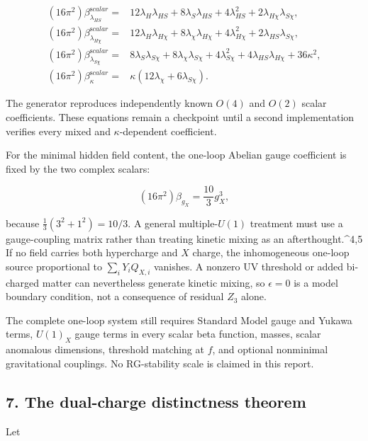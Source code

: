 \documentclass[
]{article}
\begin{document}
\[
\begin{aligned}
(16\pi^2)\beta_{\lambda_{HS}}^{\mathrm scalar}={}&
12\lambda_H\lambda_{HS}+8\lambda_S\lambda_{HS}
+4\lambda_{HS}^2+2\lambda_{H\chi}\lambda_{S\chi},\\
(16\pi^2)\beta_{\lambda_{H\chi}}^{\mathrm scalar}={}&
12\lambda_H\lambda_{H\chi}+8\lambda_\chi\lambda_{H\chi}
+4\lambda_{H\chi}^2+2\lambda_{HS}\lambda_{S\chi},\\
(16\pi^2)\beta_{\lambda_{S\chi}}^{\mathrm scalar}={}&
8\lambda_S\lambda_{S\chi}+8\lambda_\chi\lambda_{S\chi}
+4\lambda_{S\chi}^2+4\lambda_{HS}\lambda_{H\chi}
+36\kappa^2,\\
(16\pi^2)\beta_\kappa^{\mathrm scalar}={}&
\kappa(12\lambda_\chi+6\lambda_{S\chi}).
\end{aligned}
\]

The generator reproduces independently known \(O(4)\) and \(O(2)\)
scalar coefficients. These equations remain a checkpoint until a second
implementation verifies every mixed and \(\kappa\)-dependent
coefficient.

For the minimal hidden field content, the one-loop Abelian gauge
coefficient is fixed by the two complex scalars:

\[
(16\pi^2)\beta_{g_X}=\frac{10}{3}g_X^3,
\]

because \(\frac13(3^2+1^2)=10/3\). A general multiple-\(U(1)\) treatment
must use a gauge-coupling matrix rather than treating kinetic mixing as
an afterthought.\^{}4,5 If no field carries both hypercharge and \(X\)
charge, the inhomogeneous one-loop source proportional to
\(\sum_iY_iQ_{X,i}\) vanishes. A nonzero UV threshold or added
bi-charged matter can nevertheless generate kinetic mixing, so
\(\epsilon=0\) is a model boundary condition, not a consequence of
residual \(Z_3\) alone.

The complete one-loop system still requires Standard Model gauge and
Yukawa terms, \(U(1)_X\) gauge terms in every scalar beta function,
masses, scalar anomalous dimensions, threshold matching at \(f\), and
optional nonminimal gravitational couplings. No RG-stability scale is
claimed in this report.

\hypertarget{the-dual-charge-distinctness-theorem}{%
\subsection{7. The dual-charge distinctness
theorem}\label{the-dual-charge-distinctness-theorem}}

Let
\end{document}
